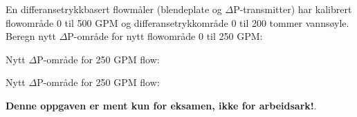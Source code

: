 

En differansetrykkbasert flowmåler (blendeplate og $\Delta$P-transmitter) har kalibrert flowområde 0 til 500 GPM og differansetrykkområde 0 til 200 tommer vannsøyle. Beregn nytt $\Delta$P-område for nytt flowområde 0 til 250 GPM:

\vskip 10pt

Nytt $\Delta$P-område for 250 GPM flow: \underbar{\hskip 50pt}







Nytt $\Delta$P-område for 250 GPM flow: 







{\bf Denne oppgaven er ment kun for eksamen, ikke for arbeidsark!}.

